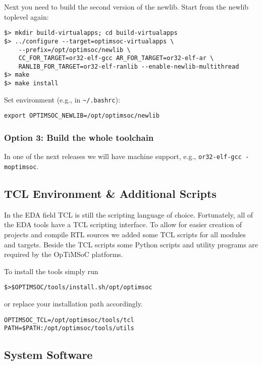 Next you need to build the second version of the newlib. Start from
the newlib toplevel again:

\begin{verbatim}
$> mkdir build-virtualapps; cd build-virtualapps
$> ../configure --target=optimsoc-virtualapps \
    --prefix=/opt/optimsoc/newlib \
    CC_FOR_TARGET=or32-elf-gcc AR_FOR_TARGET=or32-elf-ar \
    RANLIB_FOR_TARGET=or32-elf-ranlib --enable-newlib-multithread
$> make
$> make install
\end{verbatim}

Set environment (e.g., in \verb|~/.bashrc|):

\begin{verbatim}
export OPTIMSOC_NEWLIB=/opt/optimsoc/newlib
\end{verbatim}


\subsubsection{Option 3: Build the whole toolchain}

In one of the next releases we will have machine support, e.g.,
\verb|or32-elf-gcc -moptimsoc|.

\subsection{TCL Environment \& Additional Scripts}

In the EDA field TCL is still the scripting language of choice.
Fortunately, all of the EDA tools have a TCL scripting interface. To
allow for easier creation of projects and compile RTL sources we added
some TCL scripts for all modules and targets. Beside the TCL scripts
some Python scripts and utility programs are required by the OpTiMSoC
platforms.

To install the tools simply run

\begin{alltt}
\$> \$OPTIMSOC/tools/install.sh /opt/optimsoc
\end{alltt}

or replace your installation path accordingly.

\begin{alltt}
OPTIMSOC_TCL=/opt/optimsoc/tools/tcl
PATH=\$PATH:/opt/optimsoc/tools/utils
\end{alltt}

\subsection{System Software}

